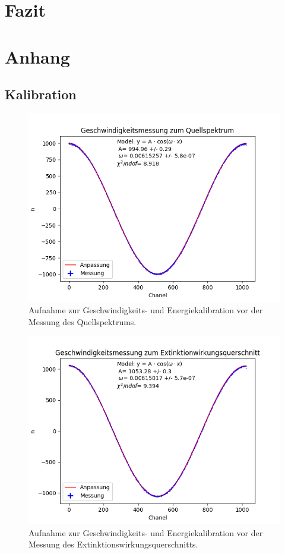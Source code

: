 \documentclass[12pt,a4paper]{article}
\begin{document}
\section{Fazit}


\newpage
\section{Anhang}
\subsection{Kalibration}
\begin{figure} [H]
\centering
\includegraphics[scale=0.8]{Bilder/Kalibration/Quellspektrum.png}
\caption{Aufnahme zur Geschwindigkeits- und Energiekalibration vor der Messung des Quellspektrums.}
\end{figure}

\begin{figure} [H]
\centering
\includegraphics[scale=0.8]{Bilder/Kalibration/Extinktion.png}
\caption{Aufnahme zur Geschwindigkeits- und Energiekalibration vor der Messung des Extinktionswirkungsquerschnitts.}
\end{figure}
\end{document}
